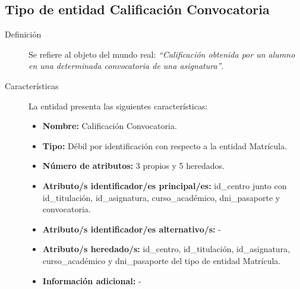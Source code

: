 \subsection{Tipo de entidad Calificación Convocatoria}

   \begin{description}

   \item[Definición] Se refiere al objeto del mundo real: \emph{``Calificación
   obtenida por un alumno en una determinada convocatoria de una asignatura''}.

   \item[Características] La entidad presenta las siguientes características:
      \begin{itemize}
         \item \textbf{Nombre:} Calificación Convocatoria.
         \item \textbf{Tipo:} Débil por identificación con respecto a la
         entidad Matrícula.
         \item \textbf{Número de atributos:} 3 propios y 5 heredados.
         \item \textbf{Atributo/s identificador/es principal/es:} id\_centro
         junto con \newline id\_titulación, id\_asignatura, curso\_académico,
         dni\_pasaporte y convocatoria.
         \item \textbf{Atributo/s identificador/es alternativo/s:} -
         \item \textbf{Atributo/s heredado/s:} id\_centro, id\_titulación,
         id\_asignatura, \newline curso\_académico y dni\_pasaporte del tipo de
         entidad Matrícula.
         \item \textbf{Información adicional:} -
      \end{itemize}


\end{description}
